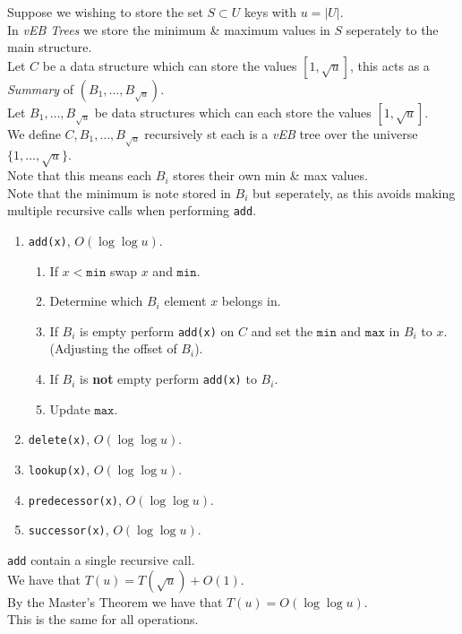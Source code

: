 \documentclass[11pt,a4paper]{article}
\begin{document}
Suppose we wishing to store the set $S\subset U$ keys with $u=|U|$.\\
In \textit{vEB Trees} we store the minimum \& maximum values in $S$ seperately to the main structure.\\
Let $C$ be a data structure which can store the values $[1,\sqrt{u}]$, this acts as a \textit{Summary} of $(B_1,\dots,B_{\sqrt{u}})$.\\
Let $B_1,\dots,B_{\sqrt{u}}$ be data structures which can each store the values $[1,\sqrt{u}]$.\\
We define $C,B_1,\dots,B_{\sqrt{u}}$ recursively st each is a \textit{vEB} tree over the universe $\{1,\dots,\sqrt{u}\}$.\\
Note that this means each $B_i$ stores their own min \& max values.\\
Note that the minimum is note stored in $B_i$ but seperately, as this avoids making multiple recursive calls when performing \lstinline!add!.
\begin{enumerate}
	\item \lstinline!add(x)!, $O(\log\log u)$.
	\begin{enumerate}
		\item If $x<\mathtt{min}$ swap $x$ and $\mathtt{min}$.
		\item Determine which $B_i$ element $x$ belongs in.
		\item If $B_i$ is empty perform \lstinline!add(x)! on $C$ and set the $\mathtt{min}$ and $\mathtt{max}$ in $B_i$ to $x$. (Adjusting the offset of $B_i$).
		\item If $B_i$ is \textbf{not} empty perform \lstinline!add(x)! to $B_i$.
		\item Update $\mathtt{max}$.
	\end{enumerate}
	\item \lstinline!delete(x)!, $O(\log\log u)$.
	\item \lstinline!lookup(x)!, $O(\log\log u)$.
	\item \lstinline!predecessor(x)!, $O(\log\log u)$.
	\item \lstinline!successor(x)!, $O(\log\log u)$.
\end{enumerate}

\lstinline!add! contain a single recursive call.\\
We have that $T(u)=T(\sqrt{u})+O(1)$.\\
By the Master's Theorem we have that $T(u)=O(\log\log u)$.\\
\nb This is the same for all operations.\\
\end{document}
